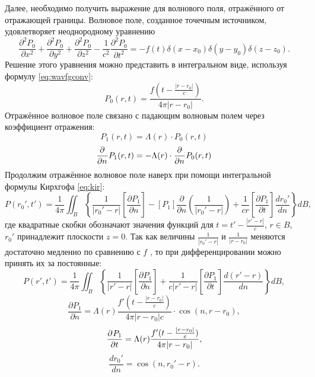 \documentclass[a4paper, fontsize=14pt]{article}
\begin{document}
	Далее, необходимо получить выражение для волнового поля, отражённого от отражающей границы.
	Волновое поле, созданное точечным источником, удовлетворяет неоднородному уравнению
	\begin{equation}
		\frac{\partial^2 P_0}{\partial x^2} + \frac{\partial^2 P_0}{\partial y^2} +
		\frac{\partial^2 P_0}{\partial z^2} - \frac{1}{c^2} \frac{\partial^2 P_0}{\partial
			t^2} = -f(t)\delta(x-x_0)\delta(y-y_0)\delta(z-z_0).
	\end{equation}
	Решение этого уравнения можно представить в интегральном виде, используя формулу \eqref{eq:wavfgconv}:
	\begin{equation}
		P_0(r,t) = \frac{f(t-\frac{|r-r_0|}{c})}{4\pi|r-r_0|}.
	\end{equation}
	Отражённое волновое поле связано с падающим волновым полем через коэффициент отражения: 
	\begin{equation}
		P_1(r,t) = \Lambda(r) \cdot P_0(r,t)
	\end{equation}
	\begin{equation}
		\frac{\partial ^ {  } }{\partial n ^ {  } }P_1(r,t) = -\Lambda(r) \cdot  \frac{\partial ^ {  } }{\partial n ^ {  } } P_0(r,t)
	\end{equation}
	Продолжим отражённое  волновое поле наверх при помощи интегральной формулы Кирхгофа \eqref{eq:kir}:
	\begin{equation}
		P\left(r_0',t'\right)=\frac{1}{4\pi}\iint_{B}^{}\left\{\frac{1}{|r_0'-r|}\left[\frac{\partial P_1}{\partial n}\right]-\left[P_1\right]\frac{\partial}{\partial n}\left(\frac{1}{|r_0'-r|}\right)+\frac{1}{c r}\left[\frac{\partial P_1}{\partial t}\right]\frac{d r_0'}{d n}\right\}d B,
		\label{eq:kirp0}
	\end{equation}
	где квадратные скобки обозначают значения функций для $t=t'-\frac{|r'-r|}{c}$, $r\in B$,  $r_0'$ принадлежит плоскости $z=0$.
	Так как величины $\frac{1}{|r_0'-r|}$ и $\frac{1}{|r-r_0|}$ меняются достаточно медленно   по сравнению с  $f$ \cite{buchen}, то при дифференцировании можно принять их за постоянные:
	\begin{equation}
		P\left(r',t'\right)=\frac{1}{4\pi}\iint_{B}^{}\left\{\frac{1}{|r'-r|}\left[\frac{\partial P_1}{\partial n}\right]+\frac{1}{c |r'-r|}\left[\frac{\partial P_1}{\partial t}\right]\frac{d (r'-r)}{d n}\right\}d B,
	\end{equation}
	\begin{equation}
		\frac{\partial P_1}{\partial n}=\Lambda(r)\frac{f'(t-\frac{|r-r_0|}{c})}{4\pi|r-r_0|c} \cdot \cos (n,r-r_0) ,
	\end{equation}
	\begin{equation}
		\frac{\partial ^ {  } P_1}{\partial t ^ {  } }=\Lambda(r)\frac{f'(t-\frac{|r-r_0|}{c})}{4\pi|r-r_0|} ,
	\end{equation}
	\begin{equation}
		\frac{d r_0'}{d n}= \cos (n,r_0'-r).
	\end{equation}
\end{document}
